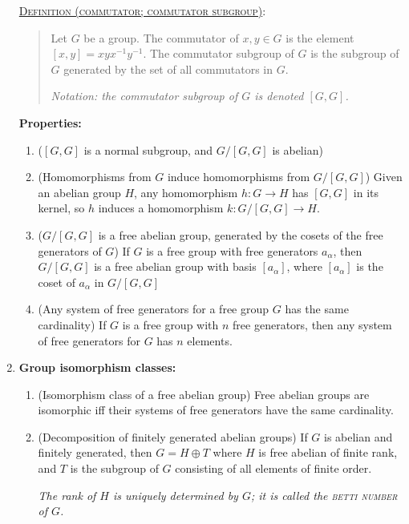 \documentclass[letterpaper, 12pt]{article}
\newcommand{\defn}[2]{\textsc{\underline{Definition (#1)}:}\begin{quote} #2\end{quote}}
\begin{document}
\begin{enumerate}[resume]
            \defn{commutator; commutator subgroup}{Let $G$ be a group. The commutator of $x,y\in G$ is the element $[x,y] = xyx^{-1}y^{-1}$. The commutator subgroup of $G$ is the subgroup of $G$ generated by the set of all commutators in $G$.

            \textit{Notation: the commutator subgroup of $G$ is denoted $[G,G]$.}}

            \textbf{Properties:}
                \begin{enumerate}
                \item ($[G,G]$ is a normal subgroup, and $G/[G,G]$ is abelian)
                \item (Homomorphisms from $G$ induce homomorphisms from $G/[G,G]$) Given an abelian group $H$, any homomorphism $h:G\to H$ has $[G,G]$ in its kernel, so $h$ induces a homomorphism $k:G/[G,G] \to H$.
                \item ($G/[G,G]$ is a free abelian group, generated by the cosets of the free generators of $G$) If $G$ is a free group with free generators $a_\alpha$, then $G/[G,G]$ is a free abelian group with basis $[a_\alpha]$, where $[a_\alpha]$ is the coset of $a_\alpha$ in $G/[G,G]$
                \item (Any system of free generators for a free group $G$ has the same cardinality) If $G$ is a free group with $n$ free generators, then any system of free generators for $G$ has $n$ elements.
                \end{enumerate}
        \item \textbf{Group isomorphism classes:}
            \begin{enumerate}
            \item (Isomorphism class of a free abelian group) Free abelian groups are isomorphic iff their systems of free generators have the same cardinality.
            \item (Decomposition of finitely generated abelian groups) If $G$ is abelian and finitely generated, then $G = H\oplus T$ where $H$ is free abelian of finite rank, and $T$ is the subgroup of $G$ consisting of all elements of finite order.

            \textit{The rank of $H$ is uniquely determined by $G$; it is called the \textsc{betti number} of $G$.}


\end{enumerate}
\end{enumerate}
\end{document}
